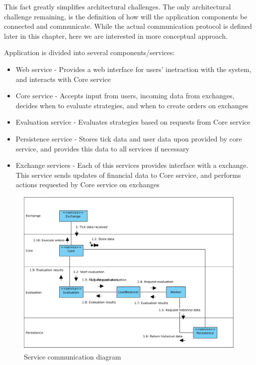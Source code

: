This fact greatly simplifies architectural challenges. The only architectural challenge remaining, is the definition
of how will the application components be connected and communicate. While the actual communication protocol is
defined later in this chapter, here we are interested in more conceptual approach.

Application is divided into several components/services:
\begin{itemize}
    \item Web service - Provides a web interface for users' inetraction with the system, and interacts with Core service
    \item Core service - Accepts input from users, incoming data from exchanges, decides when to evaluate strategies, and when to create orders on exchanges
    \item Evaluation service - Evaluates strategies based on requests from Core service
    \item Persistence service - Stores tick data and user data upon provided by core service, and provides this data to all services if necessary
    \item Exchange services - Each of this services provides interface with a exchange. This service sends updates of financial data
    to Core service, and performs actions requested by Core service on exchanges
\end{itemize}

\begin{figure}[H]
    \includegraphics[width=\textwidth]{obrazky-figures/Service communication diagram.png}
    \caption{Service communication diagram}
    \label{img:service_comm}
\end{figure}

